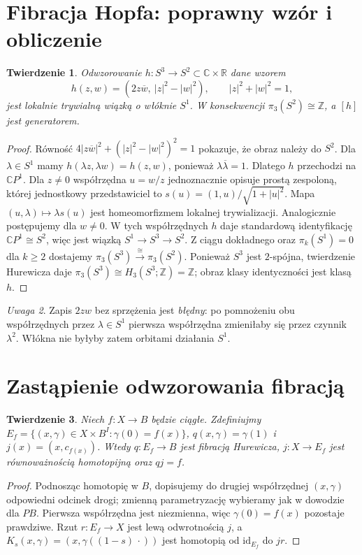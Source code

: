 \documentclass[11pt,a4paper,oneside]{report}
\newcommand{\R}{\mathbb{R}}
\newcommand{\C}{\mathbb{C}}
\newcommand{\Z}{\mathbb{Z}}
\newcommand{\id}{\mathrm{id}}
\theoremstyle{plain}
\newtheorem{twierdzenie}{Twierdzenie}[section]
\theoremstyle{definition}
\theoremstyle{remark}
\newtheorem{uwaga}[twierdzenie]{Uwaga}
\begin{document}
\section{Fibracja Hopfa: poprawny wzór i obliczenie}
\begin{twierdzenie}
\label{thm:hopf-v4}
Odwzorowanie
$h:S^3\to S^2\subset\C\times\R$ dane wzorem
\[
h(z,w)=(2z\overline w,\ |z|^2-|w|^2),\qquad
|z|^2+|w|^2=1,
\]
jest lokalnie trywialną wiązką o włóknie $S^1$.
W konsekwencji $\pi_3(S^2)\cong\Z$, a $[h]$ jest generatorem.
\end{twierdzenie}
\begin{proof}
Równość $4|z\overline w|^2+(|z|^2-|w|^2)^2=1$
pokazuje, że obraz należy do $S^2$.
Dla $\lambda\in S^1$ mamy
$h(\lambda z,\lambda w)=h(z,w)$, ponieważ
$\lambda\overline\lambda=1$.
Dlatego $h$ przechodzi na $\C P^1$.
Dla $z\ne0$ współrzędna $u=w/z$ jednoznacznie opisuje
prostą zespoloną, której jednostkowy przedstawiciel to
$s(u)=(1,u)/\sqrt{1+|u|^2}$. Mapa
$(u,\lambda)\mapsto\lambda s(u)$ jest homeomorfizmem
lokalnej trywializacji. Analogicznie postępujemy dla $w\ne0$.
W tych współrzędnych $h$ daje standardową identyfikację
$\C P^1\cong S^2$, więc jest wiązką $S^1\to S^3\to S^2$.
Z ciągu dokładnego oraz $\pi_k(S^1)=0$ dla $k\ge2$ dostajemy
$\pi_3(S^3)\xrightarrow{\cong}\pi_3(S^2)$.
Ponieważ $S^3$ jest $2$-spójna, twierdzenie Hurewicza daje
$\pi_3(S^3)\cong H_3(S^3;\Z)=\Z$; obraz klasy identyczności
jest klasą $h$.
\end{proof}
\begin{uwaga}
Zapis $2zw$ bez sprzężenia jest \emph{błędny}:
po pomnożeniu obu współrzędnych przez $\lambda\in S^1$
pierwsza współrzędna zmieniłaby się przez czynnik $\lambda^2$.
Włókna nie byłyby zatem orbitami działania $S^1$.
\end{uwaga}

\section{Zastąpienie odwzorowania fibracją}
\begin{twierdzenie}
Niech $f:X\to B$ będzie ciągłe. Zdefiniujmy
$E_f=\{(x,\gamma)\in X\times B^I:\gamma(0)=f(x)\}$,
$q(x,\gamma)=\gamma(1)$ i $j(x)=(x,c_{f(x)})$.
Wtedy $q:E_f\to B$ jest fibracją Hurewicza,
$j:X\to E_f$ jest równoważnością homotopijną oraz $qj=f$.
\end{twierdzenie}
\begin{proof}
Podnosząc homotopię w $B$, dopisujemy do drugiej współrzędnej
$(x,\gamma)$ odpowiedni odcinek drogi; zmienną parametryzację
wybieramy jak w dowodzie dla $PB$. Pierwsza współrzędna jest
niezmienna, więc $\gamma(0)=f(x)$ pozostaje prawdziwe.
Rzut $r:E_f\to X$ jest lewą odwrotnością $j$,
a $K_s(x,\gamma)=(x,\gamma((1-s)\,\cdot))$ jest
homotopią od $\id_{E_f}$ do $jr$.
\end{proof}
\end{document}
